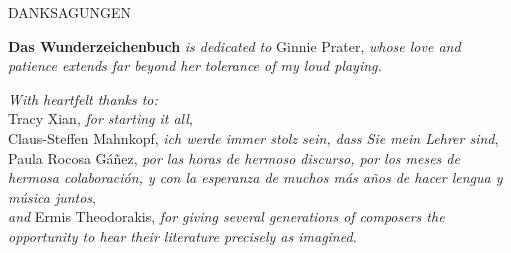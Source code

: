 \documentclass[11pt]{article}
\begin{document}
\begingroup
\begin{center}
\huge DANKSAGUNGEN
\end{center}
\endgroup

\vspace*{13\baselineskip}

\begingroup
\begin{center}
\textbf{Das Wunderzeichenbuch} \textit{is dedicated to} Ginnie Prater, \textit{whose love and patience extends far beyond her tolerance of my loud playing.}
\end{center}
\endgroup

\begingroup
\begin{center}
\textit{With heartfelt thanks to:} \\
Tracy Xian, \textit{for starting it all}, \\
Claus-Steffen Mahnkopf, \textit{ich werde immer stolz sein, dass Sie mein Lehrer sind}, \\
Paula Rocosa Gáñez, \textit{por las horas de hermoso discurso, por los meses de hermosa colaboración, y con la esperanza de muchos más años de hacer lengua y música juntos}, \\
\textit{and} Ermis Theodorakis, \textit{for giving several generations of composers the opportunity to hear their literature precisely as imagined.}
\end{center}
\endgroup
\end{document}
